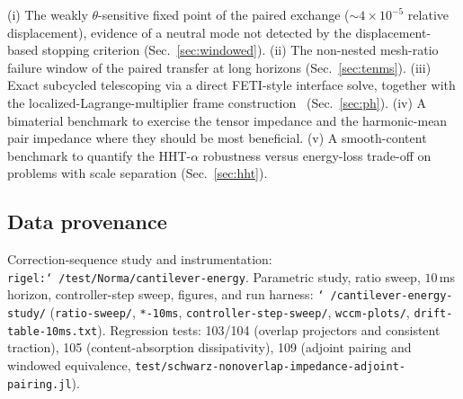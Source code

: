 \documentclass[11pt]{article}
\newcommand{\code}[1]{\texttt{#1}}
\begin{document}
(i) The weakly $\theta$-sensitive fixed point of the paired exchange
(${\sim}4\times 10^{-5}$ relative displacement), evidence of a neutral mode
not detected by the displacement-based stopping criterion
(Sec.~\ref{sec:windowed}). (ii) The non-nested mesh-ratio failure window of
the paired transfer at long horizons (Sec.~\ref{sec:tenms}). (iii) Exact
subcycled telescoping via a direct FETI-style interface solve, together
with the localized-Lagrange-multiplier frame
construction~\cite{ParkFelippaRebel2002,DvorakEtAl2023}
(Sec.~\ref{sec:ph}). (iv) A bimaterial benchmark to
exercise the tensor impedance and the harmonic-mean pair impedance where
they should be most beneficial. (v) A smooth-content benchmark to quantify
the HHT-$\alpha$ robustness versus energy-loss trade-off on problems with scale separation
(Sec.~\ref{sec:hht}).

\subsection*{Data provenance}

Correction-sequence study and instrumentation:
\code{rigel:\char`~/test/Norma/cantilever-energy}. Parametric study, ratio
sweep, $10$\,ms horizon, controller-step sweep, figures, and run harness:
\code{\char`~/cantilever-energy-study/} (\code{ratio-sweep/},
\code{*-10ms}, \code{controller-step-sweep/}, \code{wccm-plots/},
\code{drift-table-10ms.txt}). Regression tests: 103/104 (overlap
projectors and consistent traction), 105 (content-absorption
dissipativity), 109 (adjoint pairing and windowed equivalence,
\code{test/schwarz-nonoverlap-impedance-adjoint-pairing.jl}).
\end{document}

